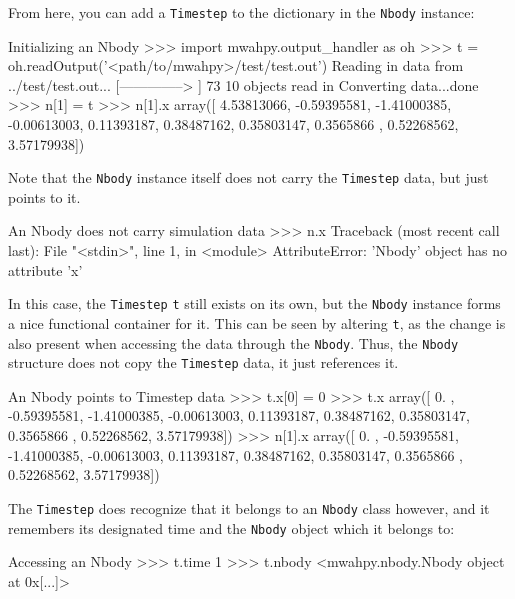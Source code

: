 \documentclass{article}
\begin{document}
From here, you can add a \verb!Timestep! to the dictionary in the \verb!Nbody! instance:\\

\begin{codelisting}{Initializing an Nbody}
>>> import mwahpy.output_handler as oh
>>> t = oh.readOutput('<path/to/mwahpy>/test/test.out')
Reading in data from ../test/test.out...
[-------------->     ] 73%
10 objects read in
Converting data...done
>>> n[1] = t
>>> n[1].x
array([ 4.53813066, -0.59395581, -1.41000385, -0.00613003,  0.11393187,
        0.38487162,  0.35803147,  0.3565866 ,  0.52268562,  3.57179938])
\end{codelisting}

Note that the \verb!Nbody! instance itself does not carry the \verb!Timestep! data, but just points to it. \\

\begin{codelisting}{An Nbody does not carry simulation data}
>>> n.x
Traceback (most recent call last):
  File "<stdin>", line 1, in <module>
AttributeError: 'Nbody' object has no attribute 'x'
\end{codelisting}

In this case, the \verb!Timestep! \verb!t! still exists on its own, but the \verb!Nbody! instance forms a nice functional container for it. This can be seen by altering \verb!t!, as the change is also present when accessing the data through the \verb!Nbody!. Thus, the \verb!Nbody! structure does not copy the \verb!Timestep! data, it just references it. \\

\begin{codelisting}{An Nbody points to Timestep data}
>>> t.x[0] = 0
>>> t.x
array([ 0.        , -0.59395581, -1.41000385, -0.00613003,  0.11393187,
        0.38487162,  0.35803147,  0.3565866 ,  0.52268562,  3.57179938])
>>> n[1].x
array([ 0.        , -0.59395581, -1.41000385, -0.00613003,  0.11393187,
        0.38487162,  0.35803147,  0.3565866 ,  0.52268562,  3.57179938])
\end{codelisting}

The \verb!Timestep! does recognize that it belongs to an \verb!Nbody! class however, and it remembers its designated time and the \verb!Nbody! object which it belongs to: \\

\begin{codelisting}{Accessing an Nbody}
>>> t.time
1
>>> t.nbody
<mwahpy.nbody.Nbody object at 0x[...]>
\end{codelisting}
\end{document}
